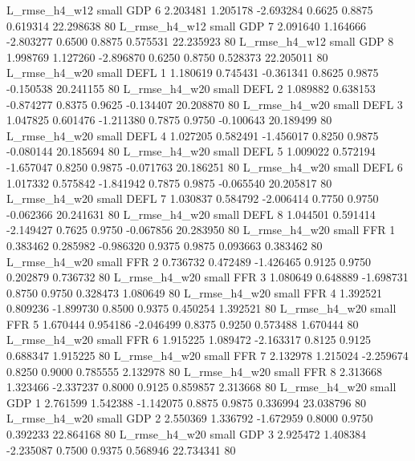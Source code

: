  L_rmse_h4_w12      small      GDP                 6 2.203481 1.205178 -2.693284 0.6625 0.8875  0.619314   22.298638 80
 L_rmse_h4_w12      small      GDP                 7 2.091640 1.164666 -2.803277 0.6500 0.8875  0.575531   22.235923 80
 L_rmse_h4_w12      small      GDP                 8 1.998769 1.127260 -2.896870 0.6250 0.8750  0.528373   22.205011 80
 L_rmse_h4_w20      small     DEFL                 1 1.180619 0.745431 -0.361341 0.8625 0.9875 -0.150538   20.241155 80
 L_rmse_h4_w20      small     DEFL                 2 1.089882 0.638153 -0.874277 0.8375 0.9625 -0.134407   20.208870 80
 L_rmse_h4_w20      small     DEFL                 3 1.047825 0.601476 -1.211380 0.7875 0.9750 -0.100643   20.189499 80
 L_rmse_h4_w20      small     DEFL                 4 1.027205 0.582491 -1.456017 0.8250 0.9875 -0.080144   20.185694 80
 L_rmse_h4_w20      small     DEFL                 5 1.009022 0.572194 -1.657047 0.8250 0.9875 -0.071763   20.186251 80
 L_rmse_h4_w20      small     DEFL                 6 1.017332 0.575842 -1.841942 0.7875 0.9875 -0.065540   20.205817 80
 L_rmse_h4_w20      small     DEFL                 7 1.030837 0.584792 -2.006414 0.7750 0.9750 -0.062366   20.241631 80
 L_rmse_h4_w20      small     DEFL                 8 1.044501 0.591414 -2.149427 0.7625 0.9750 -0.067856   20.283950 80
 L_rmse_h4_w20      small      FFR                 1 0.383462 0.285982 -0.986320 0.9375 0.9875  0.093663    0.383462 80
 L_rmse_h4_w20      small      FFR                 2 0.736732 0.472489 -1.426465 0.9125 0.9750  0.202879    0.736732 80
 L_rmse_h4_w20      small      FFR                 3 1.080649 0.648889 -1.698731 0.8750 0.9750  0.328473    1.080649 80
 L_rmse_h4_w20      small      FFR                 4 1.392521 0.809236 -1.899730 0.8500 0.9375  0.450254    1.392521 80
 L_rmse_h4_w20      small      FFR                 5 1.670444 0.954186 -2.046499 0.8375 0.9250  0.573488    1.670444 80
 L_rmse_h4_w20      small      FFR                 6 1.915225 1.089472 -2.163317 0.8125 0.9125  0.688347    1.915225 80
 L_rmse_h4_w20      small      FFR                 7 2.132978 1.215024 -2.259674 0.8250 0.9000  0.785555    2.132978 80
 L_rmse_h4_w20      small      FFR                 8 2.313668 1.323466 -2.337237 0.8000 0.9125  0.859857    2.313668 80
 L_rmse_h4_w20      small      GDP                 1 2.761599 1.542388 -1.142075 0.8875 0.9875  0.336994   23.038796 80
 L_rmse_h4_w20      small      GDP                 2 2.550369 1.336792 -1.672959 0.8000 0.9750  0.392233   22.864168 80
 L_rmse_h4_w20      small      GDP                 3 2.925472 1.408384 -2.235087 0.7500 0.9375  0.568946   22.734341 80
